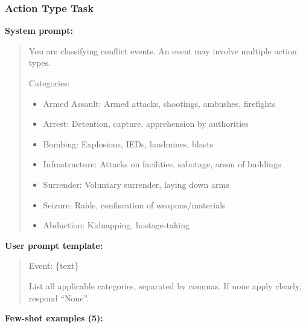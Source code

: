 \documentclass[
  11pt,
]{article}
\providecommand{\tightlist}{%
  \setlength{\itemsep}{0pt}\setlength{\parskip}{0pt}}
\begin{document}
\subsubsection{Action Type Task}\label{action-type-task-1}

\textbf{System prompt:}

\begin{quote}
You are classifying conflict events. An event may involve multiple
action types.

Categories:

\begin{itemize}
\tightlist
\item
  Armed Assault: Armed attacks, shootings, ambushes, firefights
\item
  Arrest: Detention, capture, apprehension by authorities
\item
  Bombing: Explosions, IEDs, landmines, blasts
\item
  Infrastructure: Attacks on facilities, sabotage, arson of buildings
\item
  Surrender: Voluntary surrender, laying down arms
\item
  Seizure: Raids, confiscation of weapons/materials
\item
  Abduction: Kidnapping, hostage-taking
\end{itemize}
\end{quote}

\textbf{User prompt template:}

\begin{quote}
Event: \{text\}

List all applicable categories, separated by commas. If none apply
clearly, respond ``None''.
\end{quote}

\textbf{Few-shot examples (5):}
\end{document}
